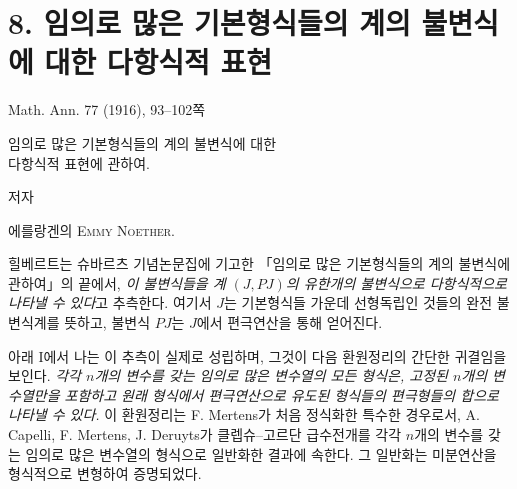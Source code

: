 
\section*{8. 임의로 많은 기본형식들의 계의 불변식에 대한 다항식적 표현}
\begin{center}
Math. Ann. 77 (1916), 93--102쪽
\end{center}

\begin{center}
{\Large 임의로 많은 기본형식들의 계의 불변식에 대한\\
다항식적 표현에 관하여.}\par
\vspace{1.2em}
저자\par
\vspace{0.8em}
에를랑겐의 {\scshape Emmy Noether}.
\end{center}

힐베르트는 슈바르츠 기념논문집에 기고한 「임의로 많은 기본형식들의 계의 불변식에 관하여」의 끝에서, \emph{이 불변식들을 계 $(J,PJ)$의 유한개의 불변식으로 다항식적으로 나타낼 수 있다}고 추측한다. 여기서 $J$는 기본형식들 가운데 선형독립인 것들의 완전 불변식계를 뜻하고, 불변식 $PJ$는 $J$에서 편극연산을 통해 얻어진다.

아래 I에서 나는 이 추측이 실제로 성립하며, 그것이 다음 환원정리의 간단한 귀결임을 보인다. \emph{각각 $n$개의 변수를 갖는 임의로 많은 변수열의 모든 형식은, 고정된 $n$개의 변수열만을 포함하고 원래 형식에서 편극연산으로 유도된 형식들의 편극형들의 합으로 나타낼 수 있다.} 이 환원정리는 F. Mertens가 처음 정식화한 특수한 경우로서, A. Capelli, F. Mertens, J. Deruyts가 클렙슈--고르단 급수전개를 각각 $n$개의 변수를 갖는 임의로 많은 변수열의 형식으로 일반화한 결과에 속한다. 그 일반화는 미분연산을 형식적으로 변형하여 증명되었다.


